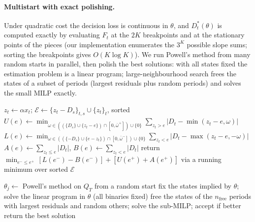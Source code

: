 \documentclass[pdflatex,sn-basic]{sn-jnl}
\theoremstyle{thmstyleone}\newtheorem{proposition}{Proposition}\newtheorem{theorem}{Theorem}
\theoremstyle{thmstylethree}\newtheorem{remark}{Remark}
\begin{document}
\paragraph{Multistart with exact polishing.} Under quadratic cost the decision loss is continuous in $\theta$, and $D^*_t(\theta)$ is computed exactly by evaluating $F_t$ at the $2K$ breakpoints and at the stationary points of the pieces (our implementation enumerates the $3^K$ possible slope sums; sorting the breakpoints gives $O(K\log K)$). We run Powell's method from many random starts in parallel, then polish the best solutions: with all states fixed the estimation problem is a linear program; large-neighbourhood search frees the states of a subset of periods (largest residuals plus random periods) and solves the small MILP exactly.

\begin{algorithm}[t]\caption{Exact one-goal estimator for fixed $\alpha$ (Theorem~\ref{thm:exact})}\label{alg:exact}
\begin{algorithmic}[1]
\State $z_t\gets\alpha x_t$; $\mathcal{E}\gets\{z_t-D_s\}_{t,s}\cup\{z_t\}_t$, sorted
  \State $U(e)\gets\min_{\omega\in((\{D_s\}\cup\{z_t-e\})\cap[0,\bar\omega^+])\cup\{0\}}\sum_{z_t>e}|D_t-\min(z_t-e,\omega)|$ 
  \State $L(e)\gets\min_{\omega\in((\{-D_s\}\cup\{e-z_t\})\cap[0,\bar\omega^-])\cup\{0\}}\sum_{z_t<e}|D_t-\max(z_t-e,-\omega)|$ 
  \State $A(e)\gets\sum_{z_t\le e}|D_t|$, $B(e)\gets\sum_{z_t<e}|D_t|$ 
\EndFor
\State return $\min_{e^-\le e^+}\,[L(e^-)-B(e^-)]+[U(e^+)+A(e^+)]$ via a running minimum over sorted $\mathcal{E}$
\end{algorithmic}\end{algorithm}
\begin{algorithm}[t]\caption{Multistart heuristic with exact polishing (several goals)}\label{alg:ms}
\begin{algorithmic}[1]
 \State $\theta_j\gets$ Powell's method on $Q_T$ from a random start \EndFor
{}
  \State fix the states implied by $\theta$; solve the linear program in $\theta$ (all binaries fixed)
   \State free the states of the $n_{\mathrm{free}}$ periods with largest residuals and random others; solve the sub-MILP; accept if better \EndFor
\EndFor
\State return the best solution
\end{algorithmic}\end{algorithm}
\end{document}
